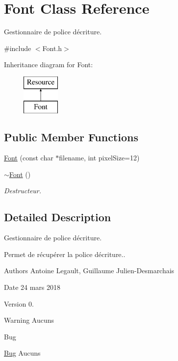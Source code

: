 \hypertarget{class_font}{}\section{Font Class Reference}
\label{class_font}


Gestionnaire de police d\textquotesingle{}écriture.  




{\ttfamily \#include $<$Font.\+h$>$}

Inheritance diagram for Font\+:\begin{figure}[H]
\begin{center}
\leavevmode
\includegraphics[height=2.000000cm]{class_font}
\end{center}
\end{figure}
\subsection*{Public Member Functions}
\begin{DoxyCompactItemize}
\item 
\hyperlink{class_font_ab0b6bd53d3ec60f30711767c5c43578e}{Font} (const char $\ast$filename, int pixel\+Size=12)
\item 
\hypertarget{class_font_a134aaa2f78af0c12d3ce504957169768}{}\hyperlink{class_font_a134aaa2f78af0c12d3ce504957169768}{$\sim$\+Font} ()\label{class_font_a134aaa2f78af0c12d3ce504957169768}

\begin{DoxyCompactList}\small\item\em Destructeur. \end{DoxyCompactList}\end{DoxyCompactItemize}


\subsection{Detailed Description}
Gestionnaire de police d\textquotesingle{}écriture. 

Permet de récupérer la police d\textquotesingle{}écriture.. \begin{DoxyAuthor}{Authors}
Antoine Legault, Guillaume Julien-\/\+Desmarchais 
\end{DoxyAuthor}
\begin{DoxyDate}{Date}
24 mars 2018 
\end{DoxyDate}
\begin{DoxyVersion}{Version}
0. 
\end{DoxyVersion}
\begin{DoxyWarning}{Warning}
Aucuns 
\end{DoxyWarning}
\begin{DoxyRefDesc}{Bug}
\item[\hyperlink{bug__bug000002}{Bug}]Aucuns \end{DoxyRefDesc}


